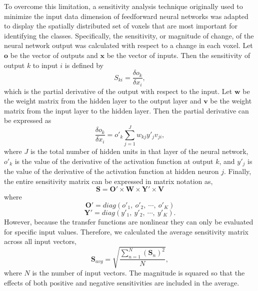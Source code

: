 \documentclass[5p,authoryear]{elsarticle}
\begin{document}
To overcome this limitation, a sensitivity analysis technique originally used to minimize the input data dimension of feedforward neural networks \citep{Zurada1994} was adapted to display the spatially distributed set of voxels that are most important for identifying the classes.
Specifically, the sensitivity, or magnitude of change, of the neural network output was calculated with respect to a change in each voxel.
Let $\mathbf{o}$ be the vector of outputs and $\mathbf{x}$ be the vector of inputs.
Then the sensitivity of output $k$ to input $i$ is defined by
\begin{equation}
S_{ki} = \frac{\delta o_{k}}{\delta x_{i}},
\end{equation}
which is the partial derivative of the output with respect to the input.
Let $\mathbf{w}$ be the weight matrix from the hidden layer to the output layer and $\mathbf{v}$ be the weight matrix from the input layer to the hidden layer.
Then the partial derivative can be expressed as
\begin{equation}
\frac{\delta o_{k}}{\delta x_{i}} = o'_{k} \sum^{J}_{j=1}{w_{kj}y'_{j}v_{ji}},
\end{equation}
where $J$ is the total number of hidden units in that layer of the neural network,  $o'_{k}$ is the value of the derivative of the activation function at output $k$, and $y'_{j}$ is the value of the derivative of the activation function at hidden neuron $j$.
Finally, the entire sensitivity matrix can be expressed in matrix notation as,
\begin{equation}
\mathbf{S} = \mathbf{O}' \times \mathbf{W} \times \mathbf{Y}' \times \mathbf{V}
\end{equation}
where
\begin{equation}
\mathbf{O}' = diag(o'_{1},~o'_{2},~\cdots,~o'_{K})
\end{equation}
\begin{equation}
\mathbf{Y}' = diag(y'_{1},~y'_{2},~\cdots,~y'_{K}).
\end{equation}
However, because the transfer functions are nonlinear they can only be evaluated for specific input values.
Therefore, we calculated the average sensitivity matrix across all input vectors,
\begin{equation}
\mathbf{S}_{avg} = \sqrt{ \frac{ \sum_{n = 1}^{N}{ \left( \mathbf{S}_{n}\right)^{2} } }{N} },
\label{eqn:sensitivity}
\end{equation}
where $N$ is the number of input vectors.
The magnitude is squared so that the effects of both positive and negative sensitivities are included in the average.
\end{document}
